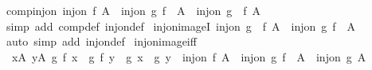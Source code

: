 \begin{isabellebody}
\isamarkupfalse%
%
\endisatagproof
{\isafoldproof}%
%
\isadelimproof
\isanewline
%
\endisadelimproof
\isanewline
{}\isamarkupfalse%
\ comp{\isacharunderscore}{\kern0pt}inj{\isacharunderscore}{\kern0pt}on{\isacharcolon}{\kern0pt}\ {\isachardoublequoteopen}inj{\isacharunderscore}{\kern0pt}on\ f\ A\ {\isasymLongrightarrow}\ inj{\isacharunderscore}{\kern0pt}on\ g\ {\isacharparenleft}{\kern0pt}f\ {\isacharbackquote}{\kern0pt}\ A{\isacharparenright}{\kern0pt}\ {\isasymLongrightarrow}\ inj{\isacharunderscore}{\kern0pt}on\ {\isacharparenleft}{\kern0pt}g\ {\isasymcirc}\ f{\isacharparenright}{\kern0pt}\ A{\isachardoublequoteclose}\isanewline
%
\isadelimproof
\ \ %
\endisadelimproof
%
\isatagproof
{}\isamarkupfalse%
\ {\isacharparenleft}{\kern0pt}simp\ add{\isacharcolon}{\kern0pt}\ comp{\isacharunderscore}{\kern0pt}def\ inj{\isacharunderscore}{\kern0pt}on{\isacharunderscore}{\kern0pt}def{\isacharparenright}{\kern0pt}%
\endisatagproof
{\isafoldproof}%
%
\isadelimproof
\isanewline
%
\endisadelimproof
\isanewline
{}\isamarkupfalse%
\ inj{\isacharunderscore}{\kern0pt}on{\isacharunderscore}{\kern0pt}imageI{\isacharcolon}{\kern0pt}\ {\isachardoublequoteopen}inj{\isacharunderscore}{\kern0pt}on\ {\isacharparenleft}{\kern0pt}g\ {\isasymcirc}\ f{\isacharparenright}{\kern0pt}\ A\ {\isasymLongrightarrow}\ inj{\isacharunderscore}{\kern0pt}on\ g\ {\isacharparenleft}{\kern0pt}f\ {\isacharbackquote}{\kern0pt}\ A{\isacharparenright}{\kern0pt}{\isachardoublequoteclose}\isanewline
%
\isadelimproof
\ \ %
\endisadelimproof
%
\isatagproof
{}\isamarkupfalse%
\ {\isacharparenleft}{\kern0pt}auto\ simp\ add{\isacharcolon}{\kern0pt}\ inj{\isacharunderscore}{\kern0pt}on{\isacharunderscore}{\kern0pt}def{\isacharparenright}{\kern0pt}%
\endisatagproof
{\isafoldproof}%
%
\isadelimproof
\isanewline
%
\endisadelimproof
\isanewline
{}\isamarkupfalse%
\ inj{\isacharunderscore}{\kern0pt}on{\isacharunderscore}{\kern0pt}image{\isacharunderscore}{\kern0pt}iff{\isacharcolon}{\kern0pt}\isanewline
\ \ {\isachardoublequoteopen}{\isasymforall}x{\isasymin}A{\isachardot}{\kern0pt}\ {\isasymforall}y{\isasymin}A{\isachardot}{\kern0pt}\ g\ {\isacharparenleft}{\kern0pt}f\ x{\isacharparenright}{\kern0pt}\ {\isacharequal}{\kern0pt}\ g\ {\isacharparenleft}{\kern0pt}f\ y{\isacharparenright}{\kern0pt}\ {\isasymlongleftrightarrow}\ g\ x\ {\isacharequal}{\kern0pt}\ g\ y\ {\isasymLongrightarrow}\ inj{\isacharunderscore}{\kern0pt}on\ f\ A\ {\isasymLongrightarrow}\ inj{\isacharunderscore}{\kern0pt}on\ g\ {\isacharparenleft}{\kern0pt}f\ {\isacharbackquote}{\kern0pt}\ A{\isacharparenright}{\kern0pt}\ {\isasymlongleftrightarrow}\ inj{\isacharunderscore}{\kern0pt}on\ g\ A{\isachardoublequoteclose}\isanewline

\end{isabellebody}
